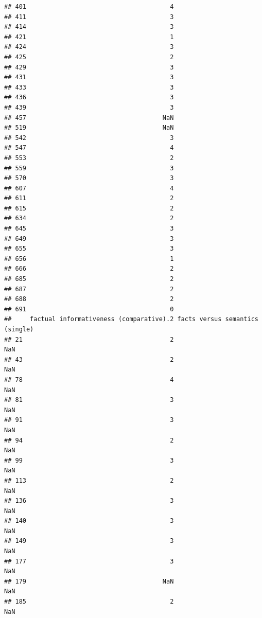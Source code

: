 \documentclass[
]{article}
\begin{document}
\begin{verbatim}
## 401                                       4
## 411                                       3
## 414                                       3
## 421                                       1
## 424                                       3
## 425                                       2
## 429                                       3
## 431                                       3
## 433                                       3
## 436                                       3
## 439                                       3
## 457                                     NaN
## 519                                     NaN
## 542                                       3
## 547                                       4
## 553                                       2
## 559                                       3
## 570                                       3
## 607                                       4
## 611                                       2
## 615                                       2
## 634                                       2
## 645                                       3
## 649                                       3
## 655                                       3
## 656                                       1
## 666                                       2
## 685                                       2
## 687                                       2
## 688                                       2
## 691                                       0
##     factual informativeness (comparative).2 facts versus semantics (single)
## 21                                        2                             NaN
## 43                                        2                             NaN
## 78                                        4                             NaN
## 81                                        3                             NaN
## 91                                        3                             NaN
## 94                                        2                             NaN
## 99                                        3                             NaN
## 113                                       2                             NaN
## 136                                       3                             NaN
## 140                                       3                             NaN
## 149                                       3                             NaN
## 177                                       3                             NaN
## 179                                     NaN                             NaN
## 185                                       2                             NaN

\end{verbatim}
\end{document}
